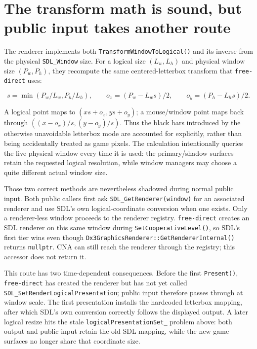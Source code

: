 \section{The transform math is sound, but public input takes another route}

The renderer implements both \texttt{TransformWindowToLogical()} and its inverse from
the physical \texttt{SDL\_Window} size. For a logical size $(L_w,L_h)$ and physical window size
$(P_w,P_h)$, they recompute the same centered-letterbox transform that
\texttt{free-direct} uses:

\[
s = \min(P_w/L_w, P_h/L_h), \qquad
o_x = (P_w - L_w s)/2, \qquad o_y = (P_h - L_h s)/2.
\]

A logical point maps to $(x s + o_x, y s + o_y)$; a mouse/window point maps back through
$((x-o_x)/s, (y-o_y)/s)$. Thus the black bars introduced by the otherwise unavoidable
letterbox mode are accounted for explicitly, rather than being accidentally treated as game
pixels. The calculation intentionally queries the live physical window every time it is used:
the primary/shadow surfaces retain the requested logical resolution, while window managers may
choose a quite different actual window size.

Those two correct methods are nevertheless shadowed during normal public input. Both public
callers first ask \texttt{SDL\_Get\allowbreak Renderer(window)} for an associated renderer and
use SDL's own logical-coordinate conversion when one exists. Only a renderer-less window
proceeds to the renderer registry. \texttt{free-direct} creates an SDL renderer on this same
window during \texttt{SetCooperative\allowbreak Level()}, so SDL's first tier wins even though
\texttt{Dx3Graphics\allowbreak Renderer::GetRenderer\allowbreak Internal()} returns
\texttt{nullptr}. CNA can still reach the renderer through the registry; this accessor does not
return it.

This route has two time-dependent consequences. Before the first \texttt{Present()},
\texttt{free-direct} has created the renderer but has not yet called
\texttt{SDL\_SetRenderLogicalPresentation}; public input therefore passes through at window
scale. The first presentation installs the hardcoded letterbox mapping, after which SDL's own
conversion correctly follows the displayed output. A later logical resize hits the stale
\texttt{logicalPresentationSet\_} problem above: both output and public input retain the old
SDL mapping, while the new game surfaces no longer share that coordinate size.

